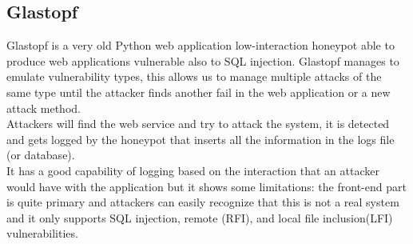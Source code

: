 \subsection{Glastopf}
Glastopf is a very old Python web application low-interaction honeypot able to produce web applications vulnerable also to SQL injection. Glastopf manages to emulate vulnerability types, this allows us to manage multiple attacks of the same type until the attacker finds another fail in the web application or a new attack method.\\
Attackers will find the web service and try to attack the system, it is detected and gets logged by the honeypot that inserts all the information in the logs file (or database).\\
It has a good capability of logging based on the interaction that an attacker would have with the application but it shows some limitations: the front-end part is quite primary and attackers can easily recognize that this is not a real system and it only supports SQL injection, remote (RFI), and local file inclusion(LFI) vulnerabilities.

